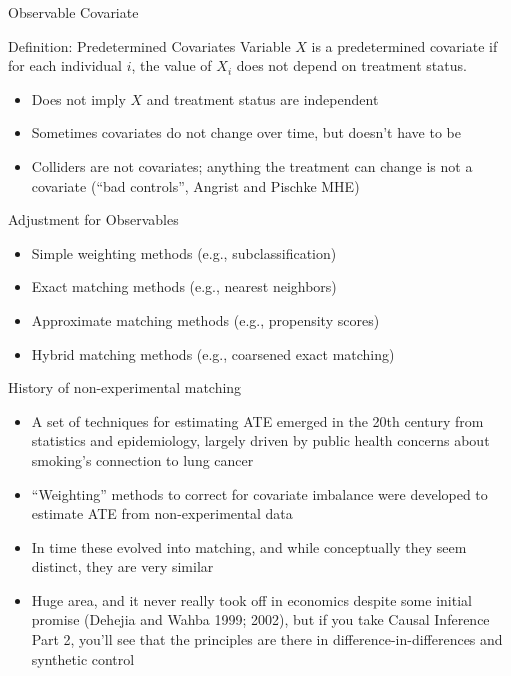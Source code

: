 \documentclass{beamer}
\begin{document}
\begin{frame}{Observable Covariate}
	
	
	\begin{block}{Definition: Predetermined Covariates}
	Variable $X$ is a predetermined covariate if for each individual $i$, the value of $X_i$ does not depend on treatment status.
	\end{block}
	
	\begin{itemize}
	\item Does not imply $X$ and treatment status are independent 
	\item Sometimes covariates do not change over time, but doesn't have to be 
	\item Colliders are not covariates; anything the treatment can change is not a covariate (``bad controls'', Angrist and Pischke MHE)
	\end{itemize}
	
\end{frame}

\begin{frame}{Adjustment for Observables}
	
	\begin{itemize}
	\item Simple weighting methods (e.g., subclassification)
	\item Exact matching methods (e.g., nearest neighbors)
	\item Approximate matching methods (e.g., propensity scores)
	\item Hybrid matching methods (e.g., coarsened exact matching)
	\end{itemize}


\end{frame}

\begin{frame}{History of non-experimental matching}

\begin{itemize}

	\item A set of techniques for estimating ATE emerged in the 20th century from statistics and epidemiology, largely driven by public health concerns about smoking's connection to lung cancer
	\item ``Weighting'' methods to correct for covariate imbalance were developed to estimate ATE from non-experimental data
	\item In time these evolved into matching, and while conceptually they seem distinct, they are very similar
	\item Huge area, and it never really took off in economics despite some initial promise (Dehejia and Wahba 1999; 2002), but if you take Causal Inference Part 2, you'll see that the principles are there in difference-in-differences and synthetic control


\end{itemize}

\end{frame}
\end{document}
